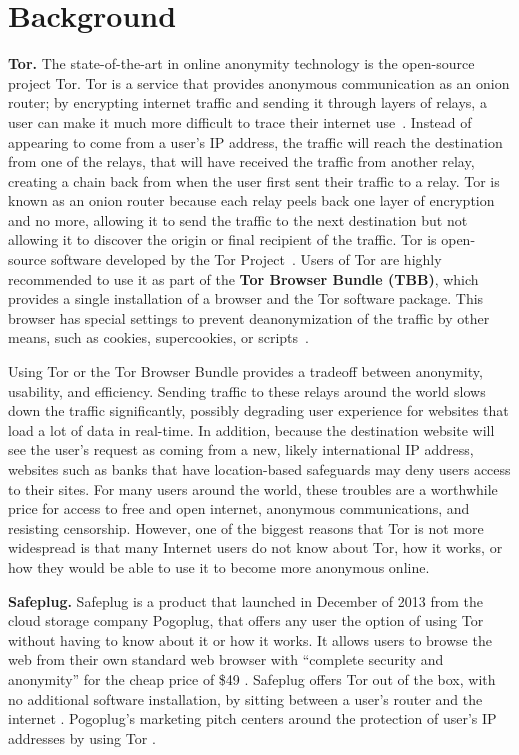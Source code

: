 \section{Background}
\label{sec:background}

{\bf Tor.} The state-of-the-art in online anonymity technology is the open-source project Tor.  Tor is a service that provides anonymous communication as an onion router; by encrypting internet traffic and sending it through layers of relays, a user can make it much more difficult to trace their internet use~\cite{tor}.  Instead of appearing to come from a user's IP address, the traffic will reach the destination from one of the relays, that will have received the traffic from another relay, creating a chain back from when the user first sent their traffic to a relay.  Tor is known as an onion router because each relay peels back one layer of encryption and no more, allowing it to send the traffic to the next destination but not allowing it to discover the origin or final recipient of the traffic.  Tor is open-source software developed by the Tor Project~\cite{torproject}.  Users of Tor are highly recommended to use it as part of the {\bf Tor Browser Bundle (TBB)}, which provides a single installation of a browser and the Tor software package.  This browser has special settings to prevent deanonymization of the traffic by other means, such as cookies, supercookies, or scripts~\cite{torproject}.

Using Tor or the Tor Browser Bundle provides a tradeoff between anonymity, usability, and efficiency.  Sending traffic to these relays around the world slows down the traffic significantly, possibly degrading user experience for websites that load a lot of data in real-time.  In addition, because the destination website will see the user's request as coming from a new, likely international IP address, websites such as banks that have location-based safeguards may deny users access to their sites.  For many users around the world, these troubles are a worthwhile price for access to free and open internet, anonymous communications, and resisting censorship.  However, one of the biggest reasons that Tor is not more widespread is that many Internet users do not know about Tor, how it works, or how they would be able to use it to become more anonymous online.

{\bf Safeplug.} Safeplug is a product that launched in December of 2013 from the cloud storage company Pogoplug, that offers any user the option of using Tor without having to know about it or how it works.  It allows users to browse the web from their own standard web browser with “complete security and anonymity” for the cheap price of \$49 \cite{safeplug}.  Safeplug offers Tor out of the box, with no additional software installation, by sitting between a user's router and the internet \cite{wired}.  Pogoplug’s marketing pitch centers around the protection of user’s IP addresses by using Tor \cite{safeplug,bittech}.


